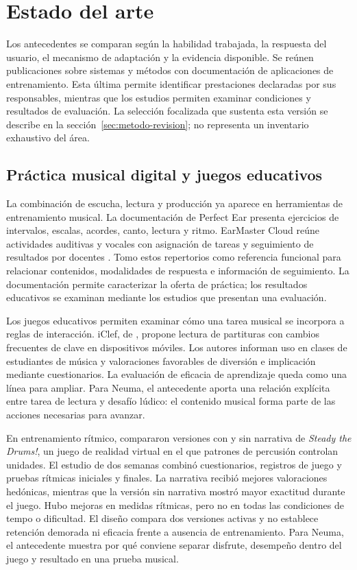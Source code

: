 \section{Estado del arte}
\label{sec:estado-arte}
Los antecedentes se comparan según la habilidad trabajada, la respuesta del
usuario, el mecanismo de adaptación y la evidencia disponible. Se reúnen
publicaciones sobre sistemas y métodos con documentación de aplicaciones de
entrenamiento. Esta última permite identificar prestaciones declaradas por sus
responsables, mientras que los estudios permiten examinar condiciones y resultados
de evaluación. La selección focalizada que sustenta esta versión se describe en
la sección~\ref{sec:metodo-revision}; no representa un inventario exhaustivo del área.

\subsection{Práctica musical digital y juegos educativos}
\label{sec:antecedentes-practica}
La combinación de escucha, lectura y producción ya aparece en herramientas de
entrenamiento musical. La documentación de Perfect Ear presenta ejercicios de
intervalos, escalas, acordes, canto, lectura y ritmo. EarMaster Cloud reúne
actividades auditivas y vocales con asignación de tareas y seguimiento de resultados
por docentes \parencite{perfectearFunciones,earmasterCloud}. Tomo estos repertorios
como referencia funcional para relacionar contenidos, modalidades de respuesta
e información de seguimiento. La documentación permite caracterizar la oferta
de práctica; los resultados educativos se examinan mediante los estudios
que presentan una evaluación.

Los juegos educativos permiten examinar cómo una tarea musical se incorpora a
reglas de interacción. iClef, de \textcite{barate2013iclef}, propone lectura de
partituras con cambios frecuentes de clave en dispositivos móviles. Los autores
informan uso en clases de estudiantes de música y valoraciones favorables de
diversión e implicación mediante cuestionarios. La evaluación de eficacia de
aprendizaje queda como una línea para ampliar. Para Neuma, el antecedente aporta
una relación explícita entre tarea de lectura y desafío lúdico: el contenido
musical forma parte de las acciones necesarias para avanzar.

En entrenamiento rítmico, \textcite{znidersic2025storytelling} compararon versiones
con y sin narrativa de \textit{Steady the Drums!}, un juego de realidad virtual
en el que patrones de percusión controlan unidades. El estudio de dos semanas
combinó cuestionarios, registros de juego y pruebas rítmicas iniciales y finales.
La narrativa recibió mejores valoraciones hedónicas, mientras que la versión sin
narrativa mostró mayor exactitud durante el juego. Hubo mejoras en medidas
rítmicas, pero no en todas las condiciones de tempo o dificultad. El diseño
compara dos versiones activas y no establece retención demorada ni eficacia frente
a ausencia de entrenamiento. Para Neuma, el antecedente muestra por qué conviene
separar disfrute, desempeño dentro del juego y resultado en una prueba musical.

